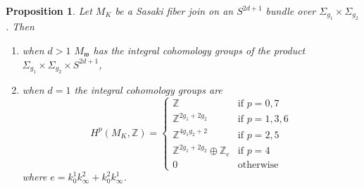 \documentclass[12pt]{amsart}
\newtheorem{proposition}[theorem]{Proposition}
\def\bbz{{\mathbb Z}}
\def\grS{\Sigma}
\def\gw{{\mathfrak w}}
\begin{document}
\begin{proposition}\label{k>1topprop}
Let $M_K$ be a Sasaki fiber join on an $S^{2d+1}$ bundle over $\grS_{g_1}\times \grS_{g_2}$. Then
\begin{enumerate}
\item  when $d>1$ $M_\gw$  has the integral cohomology groups of the product $\grS_{g_1}\times \grS_{g_2}\times S^{2d+1}$,
\item when $d=1$  the integral cohomology groups are
\begin{equation}\label{prodRcoh}
H^p(M_K,\bbz)=\begin{cases} \bbz & \text{if $p=0,7$} \\
                                                 \bbz^{2g_1+2g_2} & \text{if $p=1,3,6$} \\
                                                 \bbz^{4g_1g_2+2} & \text{if $p=2,5$} \\
                       \bbz^{2g_1+2g_2} \oplus \bbz_{e} & \text{if $p=4$} \\
                                                                                         0 &\text{otherwise}
                                                                                         \end{cases}  
\end{equation}
where $e=k^1_0k^2_\infty+k^2_0k^1_\infty$.
\end{enumerate}
\end{proposition}
\end{document}
